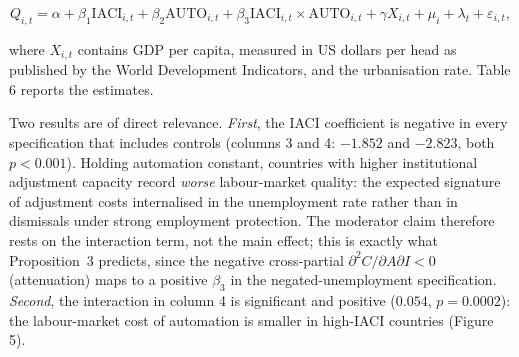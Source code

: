 \documentclass[12pt]{article}
\begin{document}
\begin{equation}
Q_{i,t} = \alpha + \beta_1 \text{IACI}_{i,t} + \beta_2 \text{AUTO}_{i,t} + \beta_3 \text{IACI}_{i,t} \times \text{AUTO}_{i,t} + \gamma X_{i,t} + \mu_i + \lambda_t + \varepsilon_{i,t},
\label{eq:panel}
\end{equation}

where $X_{i,t}$ contains GDP per capita, measured in US dollars per head as published by the World Development Indicators, and the urbanisation rate. Table 6 reports the estimates.



Two results are of direct relevance. \emph{First}, the IACI coefficient is negative in every specification that includes controls (columns 3 and 4: $-1.852$ and $-2.823$, both $p<0.001$). Holding automation constant, countries with higher institutional adjustment capacity record \emph{worse} labour-market quality: the expected signature of adjustment costs internalised in the unemployment rate rather than in dismissals under strong employment protection. The moderator claim therefore rests on the interaction term, not the main effect; this is exactly what Proposition~3 predicts, since the negative cross-partial $\partial^2 C/\partial A\partial I<0$ (attenuation) maps to a positive $\beta_3$ in the negated-unemployment specification. \emph{Second}, the interaction in column 4 is significant and positive ($0.054$, $p=0.0002$): the labour-market cost of automation is smaller in high-IACI countries (Figure 5).
\end{document}
